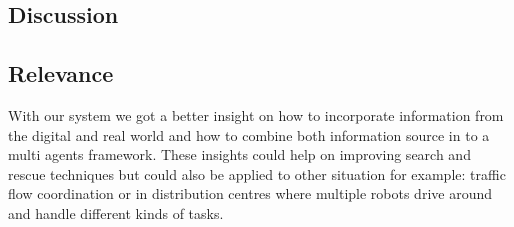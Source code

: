\subsection{Discussion}

\subsection{Relevance}

With our system we got a better insight on how to incorporate information from
the digital and real world and how to combine both information source in to a
multi agents framework. These insights could help on improving search and
rescue techniques but could also be applied to other situation for example:
traffic flow coordination or in distribution centres where multiple robots
drive around and handle different kinds of tasks.  

